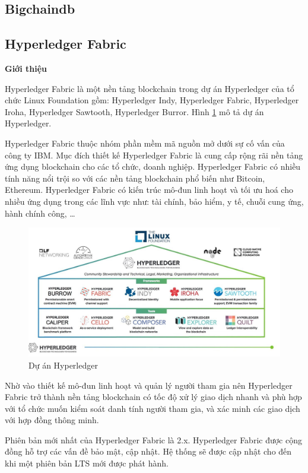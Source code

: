 \subsection{Bigchaindb}

\subsection{Hyperledger Fabric}

\textbf{Giới thiệu}

Hyperledger Fabric là một nền tảng blockchain trong dự án Hyperledger của tổ chức Linux Foundation gồm: Hyperledger Indy, Hyperledger Fabric, Hyperledger Iroha, Hyperledger Sawtooth, Hyperledger Burror. Hình \ref{fig:hlf_um} mô tả dự án Hyperledger.

Hyperledger Fabric thuộc nhóm phần mềm mã nguồn mở dưới sự cố vấn của công ty IBM. Mục đích thiết kế Hyperledger Fabric là cung cấp rộng rãi nền tảng ứng dụng blockchain cho các tổ chức, doanh nghiệp. Hyperledger Fabric có nhiều tính năng nổi trội so với các nền tảng blockchain phổ biến như Bitcoin, Ethereum. Hyperledger Fabric có kiến trúc mô-đun linh hoạt và tối ưu hoá cho nhiều ứng dụng trong các lĩnh vực như: tài chính, bảo hiểm, y tế, chuỗi cung ứng, hành chính công, \ldots{}

\begin{figure}[htbp]
\centering
\includegraphics[width=.9\linewidth]{img/hlf_um.jpg}
\caption{Dự án Hyperledger}
\label{fig:hlf_um}
\end{figure}

Nhờ vào thiết kế mô-đun linh hoạt và quản lý người tham gia nên Hyperledger Fabric trở thành nền tảng blockchain có tốc độ xử lý giao dịch nhanh và phù hợp với tổ chức muốn kiểm soát danh tính người tham gia, và xác minh các giao dịch với hợp đồng thông minh.

Phiên bản mới nhất của Hyperledger Fabric là 2.x. Hyperledger Fabric được cộng đồng hỗ trợ các vấn đề bảo mật, cập nhật. Hệ thống sẽ được cập nhật cho đến khi một phiên bản LTS mới được phát hành.

